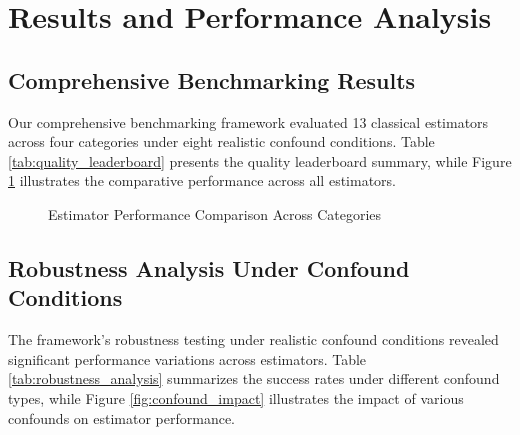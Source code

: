 \section{Results and Performance Analysis}

\subsection{Comprehensive Benchmarking Results}

Our comprehensive benchmarking framework evaluated 13 classical estimators across four categories under eight realistic confound conditions. Table \ref{tab:quality_leaderboard} presents the quality leaderboard summary, while Figure \ref{fig:estimator_performance} illustrates the comparative performance across all estimators.

\begin{table}[h]
\centering
\caption{Quality Leaderboard Summary}
\label{tab:quality_leaderboard}
\end{table}

\begin{figure}[h]
\centering
\caption{Estimator Performance Comparison Across Categories}
\label{fig:estimator_performance}
\end{figure}

\subsection{Robustness Analysis Under Confound Conditions}

The framework's robustness testing under realistic confound conditions revealed significant performance variations across estimators. Table \ref{tab:robustness_analysis} summarizes the success rates under different confound types, while Figure \ref{fig:confound_impact} illustrates the impact of various confounds on estimator performance.

